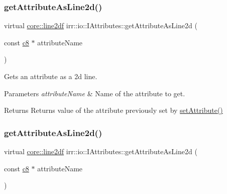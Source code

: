 \subsubsection{\texorpdfstring{get\+Attribute\+As\+Line2d()}{getAttributeAsLine2d()}\hspace{0.1cm}{\footnotesize\ttfamily [1/4]}}
{\footnotesize\ttfamily virtual \hyperlink{namespaceirr_1_1core_aeb733b0cceca2d174bf42ad477566204}{core\+::line2df} irr\+::io\+::\+I\+Attributes\+::get\+Attribute\+As\+Line2d (\begin{DoxyParamCaption}\item[{const \hyperlink{namespaceirr_a9395eaea339bcb546b319e9c96bf7410}{c8} $\ast$}]{attribute\+Name }\end{DoxyParamCaption})\hspace{0.3cm}{\ttfamily [pure virtual]}}



Gets an attribute as a 2d line. 


\begin{DoxyParams}{Parameters}
{\em attribute\+Name} & Name of the attribute to get. \\
\hline
\end{DoxyParams}
\begin{DoxyReturn}{Returns}
Returns value of the attribute previously set by \hyperlink{classirr_1_1io_1_1IAttributes_a03fa31acb481ae23678676cc183f09a6}{set\+Attribute()} 
\end{DoxyReturn}
\mbox{\label{classirr_1_1io_1_1IAttributes_ace0d40cce5fad56cbe030d63c5743854}} 
\subsubsection{\texorpdfstring{get\+Attribute\+As\+Line2d()}{getAttributeAsLine2d()}\hspace{0.1cm}{\footnotesize\ttfamily [2/4]}}
{\footnotesize\ttfamily virtual \hyperlink{namespaceirr_1_1core_aeb733b0cceca2d174bf42ad477566204}{core\+::line2df} irr\+::io\+::\+I\+Attributes\+::get\+Attribute\+As\+Line2d (\begin{DoxyParamCaption}\item[{const \hyperlink{namespaceirr_a9395eaea339bcb546b319e9c96bf7410}{c8} $\ast$}]{attribute\+Name }\end{DoxyParamCaption})\hspace{0.3cm}{\ttfamily [pure virtual]}}



